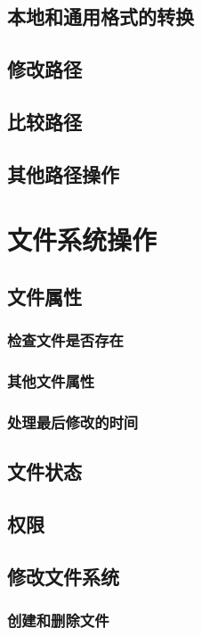 \subsection{本地和通用格式的转换}\label{ch20.3.4}

\subsection{修改路径}

\subsection{比较路径}

\subsection{其他路径操作}


\section{文件系统操作}

\subsection{文件属性}
\subsubsection{检查文件是否存在}\label{ch20.4.1.1}
\subsubsection{其他文件属性}
\subsubsection{处理最后修改的时间}

\subsection{文件状态}

\subsection{权限}

\subsection{修改文件系统}
\subsubsection{创建和删除文件}
